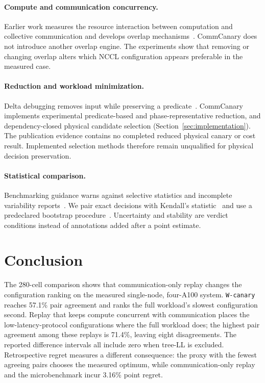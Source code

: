 \documentclass[10pt,twocolumn]{article}
\newcommand{\wname}[1]{\texttt{W-#1}}
\begin{document}
\paragraph{Compute and communication concurrency.} Earlier work measures the
resource interaction between computation and collective communication and
develops overlap mechanisms~\cite{overlap}. CommCanary does not introduce
another overlap engine. The experiments show that removing or changing overlap
alters which NCCL configuration appears preferable in the measured case.

\paragraph{Reduction and workload minimization.} Delta debugging removes input
while preserving a predicate~\cite{ddmin}. CommCanary implements experimental
predicate-based and phase-representative reduction, and dependency-closed
physical candidate selection (Section~\ref{sec:implementation}). The
publication evidence contains no completed reduced physical canary or cost
result. Implemented selection methods therefore remain unqualified for
physical decision preservation.

\paragraph{Statistical comparison.} Benchmarking guidance warns against
selective statistics and incomplete variability reports~\cite{benchmarking}.
We pair exact decisions with Kendall's statistic~\cite{kendall} and use a
predeclared bootstrap procedure~\cite{efron}. Uncertainty and stability are
verdict conditions instead of annotations added after a point estimate.

\section{Conclusion}

The 280-cell comparison shows that communication-only replay changes the
configuration ranking on the measured single-node, four-A100 system.
\wname{canary} reaches
57.1\% pair agreement and ranks the full workload's slowest configuration
second. Replay that keeps compute concurrent with communication places the
low-latency-protocol configurations where the full workload does; the
highest pair agreement among these replays is 71.4\%, leaving eight
disagreements. The reported difference intervals all include zero when tree-LL
is excluded. Retrospective regret measures a different consequence:
the proxy with the fewest agreeing pairs chooses the measured optimum, while
communication-only replay and the microbenchmark incur 3.16\% point regret.
\end{document}
